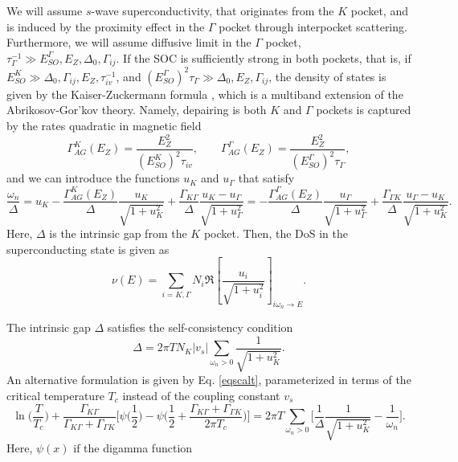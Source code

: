 \documentclass[showpacs,superscriptaddress,onecolumn,prb]{revtex4}
\begin{document}
We will assume $s$-wave superconductivity, that originates from the $K$ pocket, and is induced by the proximity effect in the $\Gamma$ pocket through interpocket scattering. Furthermore, we will assume diffusive limit in the $\Gamma$ pocket, $\tau_\Gamma^{-1}\gg E_{SO}^\Gamma, E_Z, \Delta_0, \Gamma_{ij}$. If the SOC is sufficiently strong in both pockets, that is, if $E_{SO}^K\gg \Delta_0, \Gamma_{ij}, E_Z, \tau_{iv}^{-1}$, and $(E_{SO}^\Gamma)^2\tau_\Gamma \gg \Delta_0,E_Z,\Gamma_{ij}$, the density of states is given by the Kaiser-Zuckermann formula \cite{kaiser1970mcmillan}, which is a multiband extension of the Abrikosov-Gor'kov theory.  Namely, depairing is both $K$ and $\Gamma$ pockets is captured by the rates quadratic in magnetic field
\begin{equation}
\Gamma_{AG}^K(E_Z)=\frac{E_Z^2}{(E_{SO}^K)^2 \tau_{iv}}, \qquad
\Gamma_{AG}^\Gamma(E_Z)=\frac{E_Z^2}{(E_{SO}^\Gamma)^2 \tau_\Gamma},
\end{equation}
and we can introduce the functions $u_K$ and $u_\Gamma$ that satisfy
\begin{equation}
\frac{\omega_n}{\Delta}=u_K-\frac{\Gamma_{AG}^K(E_Z)}{\Delta}\frac{u_K}{\sqrt{1+u_K^2}}+\frac{\Gamma_{K\Gamma}}{\Delta}\frac{u_K-u_\Gamma}{\sqrt{1+u_\Gamma^2}} = -\frac{\Gamma_{AG}^\Gamma(E_Z)}{\Delta}\frac{u_\Gamma}{\sqrt{1+u_\Gamma^2}}+\frac{\Gamma_{\Gamma K}}{\Delta}\frac{u_\Gamma-u_K}{\sqrt{1+u_K^2}}.
\label{eq4}
\end{equation}
Here, $\Delta$ is the intrinsic gap from the $K$ pocket. Then, the DoS in the superconducting state is given as
\begin{equation}
\nu(E)=\sum_{i=K,\Gamma} N_i \Re\left[\frac{u_i}{\sqrt{1+u_i^2}}\right]_{i\omega_n\to E}.
\end{equation}

The intrinsic gap $\Delta$ satisfies the self-consistency condition
\begin{equation}
\Delta=2\pi T N_K |v_s| \sum_{\omega_n>0}\frac{1}{\sqrt{1+u_K^2}}.
\label{eq6}
\end{equation}
An alternative formulation is given by Eq. \eqref{eqscalt}, parameterized in terms of the critical temperature $T_c$ instead of the coupling constant $v_s$
\begin{equation}
\ln \bigg(\frac{T}{T_c}\bigg)+\frac{\Gamma_{K\Gamma}}{\Gamma_{K\Gamma}+\Gamma_{\Gamma K}}\bigg[\psi \bigg(\frac{1}{2}\bigg)-\psi \bigg(\frac{1}{2}+\frac{\Gamma_{K\Gamma}+\Gamma_{\Gamma K}}{2 \pi  T_c}\bigg)\bigg]=2 \pi T \sum_{\omega_n>0} \bigg[\frac{1}{\Delta}\frac{1}{\sqrt{1+u_K^2}}  - \frac{1}{\omega_n} \bigg].
\label{eqscalt}
\end{equation}
Here, $\psi(x)$ if the digamma function
\end{document}
